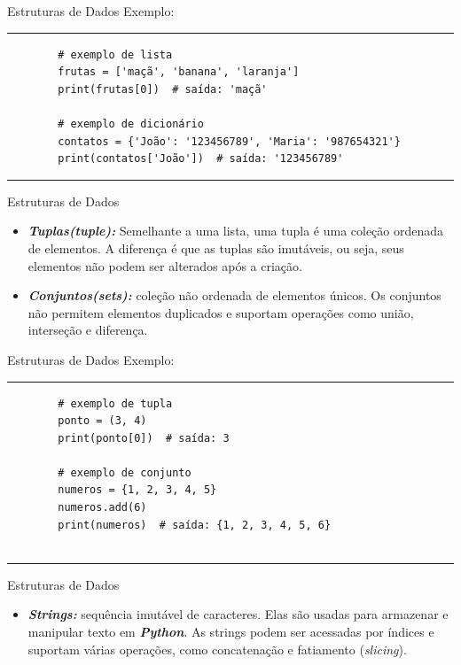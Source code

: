 \documentclass{beamer}
\begin{document}
\begin{frame}[fragile]{Estruturas de Dados}
	\label{estruturas_de_dados_exemplo}
	Exemplo:
	\rule{\textwidth}{1pt}
	\scriptsize
	\begin{verbatim}
		# exemplo de lista
		frutas = ['maçã', 'banana', 'laranja']
		print(frutas[0])  # saída: 'maçã'
		
		# exemplo de dicionário
		contatos = {'João': '123456789', 'Maria': '987654321'}
		print(contatos['João'])  # saída: '123456789'
	\end{verbatim}
	\rule{\textwidth}{1pt}
\end{frame}

\begin{frame}[fragile]{Estruturas de Dados}
	\label{estruturas_de_dados_01}
	\begin{itemize}
		\item \textbf{\textit{Tuplas(tuple):}} Semelhante a uma lista, uma tupla é uma coleção ordenada de elementos. A diferença é que as tuplas são imutáveis, ou seja, seus elementos não podem ser alterados após a criação.
		\item \textbf{\textit{Conjuntos(sets):}} coleção não ordenada de elementos únicos. Os conjuntos não permitem elementos duplicados e suportam operações como união, interseção e diferença.
	\end{itemize}
\end{frame}

\begin{frame}[fragile]{Estruturas de Dados}
	\label{estruturas_de_dados_01_exemplo}
	Exemplo:
	\rule{\textwidth}{1pt}
	\scriptsize
	\begin{verbatim}
		# exemplo de tupla
		ponto = (3, 4)
		print(ponto[0])  # saída: 3
		
		# exemplo de conjunto
		numeros = {1, 2, 3, 4, 5}
		numeros.add(6)
		print(numeros)  # saída: {1, 2, 3, 4, 5, 6}
		
	\end{verbatim}
	\rule{\textwidth}{1pt}
\end{frame}

\begin{frame}[fragile]{Estruturas de Dados}
	\label{estruturas_de_dados_02}
	\begin{itemize}
		\item \textbf{\textit{Strings:}} sequência imutável de caracteres. Elas são usadas para armazenar e manipular texto em \textbf{\textit{Python}}. As strings podem ser acessadas por índices e suportam várias operações, como concatenação e fatiamento (\textit{slicing}).
	\end{itemize}
\end{frame}
\end{document}
